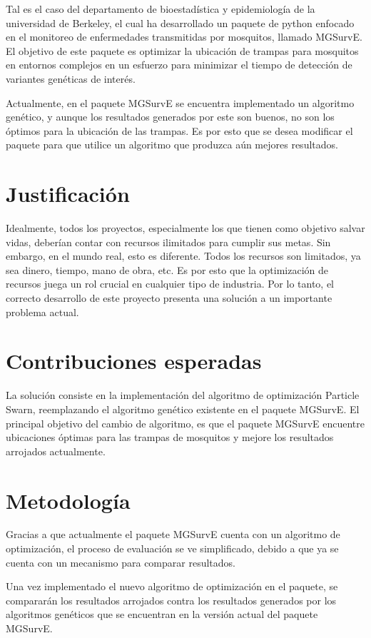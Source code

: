 \documentclass[letterpaper, 10pt, conference]{ieeeconf}
\begin{document}
Tal es el caso del departamento de bioestadística y epidemiología de la universidad de Berkeley, el cual ha desarrollado un paquete de python enfocado en el monitoreo de enfermedades transmitidas por mosquitos, llamado MGSurvE. El objetivo de este paquete es optimizar la ubicación de trampas para mosquitos en entornos complejos en un esfuerzo para minimizar el tiempo de detección de variantes genéticas de interés\cite{MGSurvEPyPi}.

Actualmente, en el paquete MGSurvE se encuentra implementado un algoritmo genético, y aunque los resultados generados por este son buenos, no son los óptimos para la ubicación de las trampas. Es por esto que se desea modificar el paquete para que utilice un algoritmo que produzca aún mejores resultados. 

\section{Justificación}
Idealmente, todos los proyectos, especialmente los que tienen como objetivo salvar vidas, deberían contar con recursos ilimitados para cumplir sus metas. Sin embargo, en el mundo real, esto es diferente. Todos los recursos son limitados, ya sea dinero, tiempo, mano de obra, etc. Es por esto que la optimización de recursos juega un rol crucial en cualquier tipo de industria. Por lo tanto, el correcto desarrollo de este proyecto presenta una solución a un importante problema actual.

\section{Contribuciones esperadas}
La solución consiste en la implementación del algoritmo de optimización Particle Swarn, reemplazando el algoritmo genético existente en el paquete MGSurvE. El principal objetivo del cambio de algoritmo, es que el paquete MGSurvE encuentre ubicaciones óptimas para las trampas de mosquitos y mejore los resultados arrojados actualmente.

\section{Metodología}
Gracias a que actualmente el paquete MGSurvE cuenta con un algoritmo de optimización, el proceso de evaluación se ve simplificado, debido a que ya se cuenta con un mecanismo para comparar resultados.

Una vez implementado el nuevo algoritmo de optimización en el paquete, se compararán los resultados arrojados contra los resultados generados por los algoritmos genéticos que se encuentran en la versión actual del paquete MGSurvE. 
\end{document}
